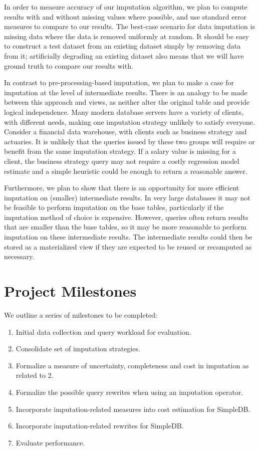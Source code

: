 \documentclass{article}
\begin{document}
In order to measure accuracy of our imputation algorithm, we plan to compute results with and without missing values where possible, and use standard error measures to compare to our results. The best-case scenario for data imputation is missing data where the data is removed uniformly at random. It should be easy to construct a test dataset from an existing dataset simply by removing data from it; artificially degrading an existing dataset also means that we will have ground truth to compare our results with.

In contrast to pre-processing-based imputation, we plan to make a case for imputation at the level of intermediate results. There is an analogy to be made between this approach and views, as neither alter the original table and provide logical independence. Many modern database servers have a variety of clients, with different needs, making one imputation strategy unlikely to satisfy everyone. Consider a financial data warehouse, with clients such as business strategy and actuaries. It is unlikely that the queries issued by these two groups will require or benefit from the same imputation strategy. If a salary value is missing for a client, the business strategy query may not require a costly regression model estimate and a simple heuristic could be enough to return a reasonable answer. 

Furthermore, we plan to show that there is an opportunity for more efficient imputation on (smaller) intermediate results. In very large databases it may not be feasible to perform imputation on the base tables, particularly if the imputation method of choice is expensive. However, queries often return results that are smaller than the base tables, so it may be more reasonable to perform imputation on these intermediate results. The intermediate results could then be stored as a materialized view if they are expected to be reused or recomputed as necessary.

\section{Project Milestones}

We outline a series of milestones to be completed:
\begin{enumerate}
\item Initial data collection and query workload for evaluation.
\item Consolidate set of imputation strategies.
\item Formalize a measure of uncertainty, completeness and cost in imputation as related to 2.
\item Formalize the possible query rewrites when using an imputation operator.
\item Incorporate imputation-related measures into cost estimation for SimpleDB.
\item Incorporate imputation-related rewrites for SimpleDB.
\item Evaluate performance.
\end{enumerate}
\end{document}
